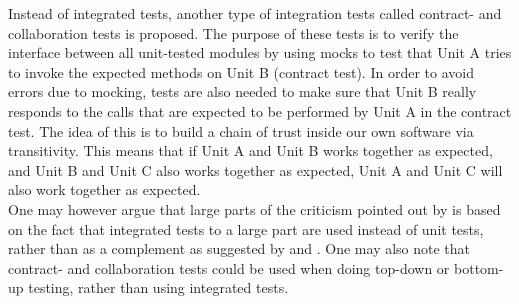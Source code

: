 Instead of integrated tests, another type of integration tests called
contract- and collaboration tests is proposed. The purpose of these
tests is to verify the interface between all unit-tested modules by
using mocks to test that Unit A tries to invoke the expected methods on
Unit B (contract test). In order to avoid errors due to mocking, tests
are also needed to make sure that Unit B really responds to the calls
that are expected to be performed by Unit A in the contract test. The
idea of this is to build a chain of trust inside our own software via
transitivity. This means that if Unit A and Unit B works together as
expected, and Unit B and Unit C also works together as expected, Unit A
and Unit C will also work together as expected.\\

One may however argue that large parts of the criticism pointed out by
\citeauthor{video:integrated_scam} is based on the fact that integrated
tests to a large part are used instead of unit tests, rather than as a
complement as suggested by \citeauthor{book:pfleeger} and
\citeauthor{book:adp}. One may also note that contract- and
collaboration tests could be used when doing top-down or bottom-up
testing, rather than using integrated tests.\\
